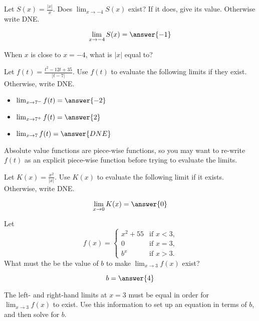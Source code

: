 \documentclass[handout]{ximera}
\begin{document}

\begin{exercise}
Let $S(x) = \frac{|x|}{x}$.  Does $\displaystyle\lim_{x \to -4} S(x)$ exist?  If it
does, give its value.  Otherwise write DNE.

\[
\lim_{x \to -4} S(x) = \answer{-1}
\] 

\begin{hint}
When $x$ is close to $x=-4$, what is $|x|$ equal to? 
\end{hint}

\end{exercise}

\begin{exercise}
Let $f(t) = \frac{t^2 - 12t +35}{|t-7|}$.  Use $f(t)$ to evaluate the following limits if they exist.  Otherwise, write DNE.

\begin{itemize}

\item [] $\lim_{x \to 7^-} f(t) = \answer{-2}$

\item [] $\lim_{x \to 7^+} f(t) = \answer{2}$

\item [] $\lim_{x \to 7} f(t) = \answer{DNE}$

\end{itemize}

\begin{hint}
Absolute value functions are piece-wise functions, so you may want to re-write $f(t)$ as an explicit piece-wise function before trying to evaluate the limits. 
\end{hint}

\end{exercise}

\begin{exercise}
Let $K(x) = \frac{x^2}{|x|}$.  Use $K(x)$ to evaluate the following limit if it exists.  Otherwise, write DNE.

\[
\lim_{x \to 0} K(x) = \answer{0}
\]

\end{exercise}

\begin{exercise}
Let
\[
f(x) =
\begin{cases} x^2+55 &\text{if $x<3$,}\\
  0 &\text{if $x=3$,} \\
  b^x &\text{if $x>3$.}
\end{cases}
\]  
What must the be the value of $b$ to make $\displaystyle\lim_{x \to 3} f(x)$ exist?

\[
b = \answer{4}
\]

\begin{hint}
  The left- and right-hand limits at $x=3$ must be equal in order for $\displaystyle\lim_{x \to 3} f(x)$ to exist.  Use this information to
  set up an equation in terms of $b$, and then solve for $b$.
\end{hint}
\end{exercise}
\end{document}
